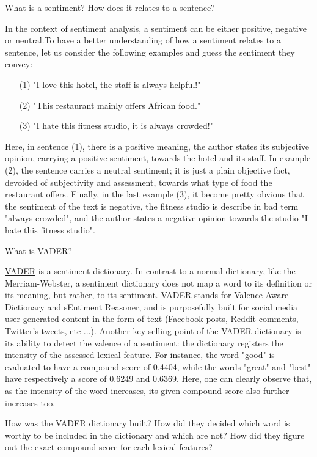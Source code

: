 	What is a sentiment? How does it relates to a sentence?
	
	In the context of sentiment analysis, a sentiment can be either positive, negative or neutral.To have a better understanding of how a sentiment relates to a sentence, let us consider the following examples and guess the sentiment they convey:
	\begin{enumerate}
	\item[(1)] "I love this hotel, the staff is always helpful!"
	\item[(2)] "This restaurant mainly offers African food."
	\item[(3)] "I hate this fitness studio, it is always crowded!"
	\end{enumerate}

	Here, in sentence (1), there is a positive meaning, the author states its subjective opinion, carrying a positive sentiment, towards the hotel and its staff. In example (2), the sentence carries a neutral sentiment; it is just a plain objective fact, devoided of subjectivity and assessment, towards what type of food the restaurant offers. Finally, in the last example (3), it become pretty obvious that the sentiment of the text is negative, the fitness studio is describe in bad term "always crowded", and the author states a negative opinion towards the studio "I hate this fitness studio".
	
	What is VADER?
	
	\href{https://github.com/cjhutto/vaderSentiment}{VADER} is a sentiment dictionary. In contrast to a normal dictionary, like the Merriam-Webster, a sentiment dictionary does not map a word to its definition or its meaning, but rather, to its sentiment.
	VADER stands for Valence Aware Dictionary and sEntiment Reasoner, and is purposefully built for social media user-generated content in the form of text (Facebook posts, Reddit comments, Twitter's tweets, etc ...). Another key selling point of the VADER dictionary is its ability to detect the valence of a sentiment: the dictionary registers the intensity of the assessed lexical feature. For instance, the word "good" is evaluated to have a compound score of 0.4404, while the words "great" and "best" have respectively a score of 0.6249 and 0.6369. Here, one can clearly observe that, as the intensity of the word increases, its given compound score also further increases too.\newline
	
	How was the VADER dictionary built? How did they decided which word is worthy to be included in the dictionary and which are not? How did they figure out the exact compound score for each lexical features?
	
